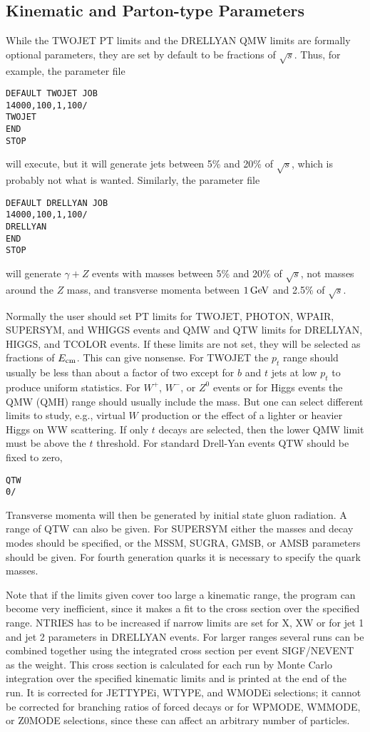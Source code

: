 \newpage
\subsection{Kinematic and Parton-type Parameters}

      While the TWOJET PT limits and the DRELLYAN QMW limits are
formally optional parameters, they are set by default to be fractions of
$\sqrt{s}$. Thus, for example, the parameter file
\begin{verbatim}
DEFAULT TWOJET JOB
14000,100,1,100/
TWOJET
END
STOP
\end{verbatim}
will execute, but it will generate jets between 5\% and 20\% of
$\sqrt{s}$, which is probably not what is wanted. Similarly, the
parameter file
\begin{verbatim}
DEFAULT DRELLYAN JOB
14000,100,1,100/
DRELLYAN
END
STOP
\end{verbatim}
will generate $\gamma + Z$ events with masses between 5\% and 20\% of
$\sqrt{s}$, not masses around the $Z$ mass, and transverse momenta
between $1\,{\rm GeV}$ and 2.5\% of $\sqrt{s}$.

      Normally the user should set PT limits for TWOJET, PHOTON, WPAIR,
SUPERSYM, and WHIGGS events and QMW and QTW limits for DRELLYAN,
HIGGS, and TCOLOR events. If these limits are not set, they will be
selected as fractions of $E_{\rm cm}$. This can give nonsense. For
TWOJET the $p_t$ range should usually be less than about a factor of
two except for $b$ and $t$ jets at low $p_t$ to produce uniform
statistics. For $W^+$, $W^-$, or $Z^0$ events or for Higgs events the
QMW (QMH) range should usually include the mass. But one can select
different limits to study, e.g., virtual $W$ production or the effect
of a lighter or heavier Higgs on WW scattering. If only $t$ decays are
selected, then the lower QMW limit must be above the $t$ threshold.
For standard Drell-Yan events QTW should be fixed to zero,
\begin{verbatim}
QTW
0/
\end{verbatim}
Transverse momenta will then be generated by initial state gluon
radiation. A range of QTW can also be given. For SUPERSYM either the
masses and decay modes should be specified, or the MSSM, SUGRA, GMSB, or
AMSB parameters should be given. For fourth generation quarks it is
necessary to specify the quark masses.

      Note that if the limits given cover too large a kinematic range,
the program can become very inefficient, since it makes a fit to the
cross section over the specified range. NTRIES has to be increased if
narrow limits are set for X, XW or for jet 1 and jet 2 parameters in
DRELLYAN events. For larger ranges several runs can be combined together
using the integrated cross section per event SIGF/NEVENT as the weight.
This cross section is calculated for each run by Monte Carlo integration
over the specified kinematic limits and is printed at the end of the
run. It is corrected for JETTYPEi, WTYPE, and WMODEi selections; it
cannot be corrected for branching ratios of forced decays or for WPMODE,
WMMODE, or Z0MODE selections, since these can affect an arbitrary number
of particles.

